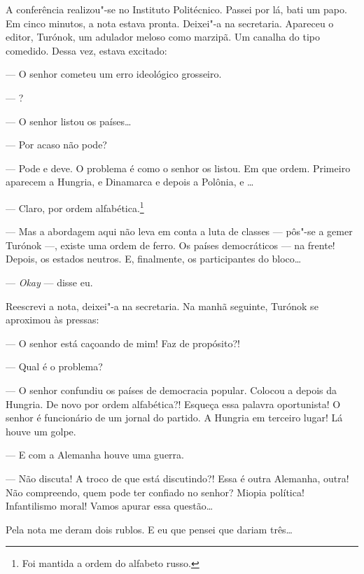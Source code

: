 A conferência realizou"-se no Instituto Politécnico. Passei por lá, bati
um papo. Em cinco minutos, a nota estava pronta. Deixei"-a na secretaria.
Apareceu o editor, Turónok, um adulador meloso como marzipã. Um canalha
do tipo comedido. Dessa vez, estava excitado:

--- O senhor cometeu um erro ideológico grosseiro.

--- ?

--- O senhor listou os países\ldots{}

--- Por acaso não pode?

--- Pode e deve. O problema é como o senhor os listou. Em que ordem.
Primeiro aparecem a Hungria,  e Dinamarca e depois a Polônia,  e
\ldots{}

--- Claro, por ordem alfabética.\footnote{Foi mantida a ordem do
  alfabeto russo.}

--- Mas a abordagem aqui não leva em conta a luta de classes --- pôs"-se a gemer Turónok
---, existe uma ordem de ferro. Os países democráticos --- na frente!
Depois, os estados neutros. E, finalmente, os participantes do bloco\ldots{}

--- \emph{Okay} --- disse eu.

Reescrevi a nota, deixei"-a na secretaria. Na manhã seguinte, Turónok se
aproximou às pressas:

--- O senhor está caçoando de mim! Faz de propósito?!

--- Qual é o problema?

--- O senhor confundiu os países de democracia popular. Colocou a 
depois da Hungria. De novo por ordem alfabética?! Esqueça essa palavra
oportunista! O senhor é funcionário de um jornal do partido. A Hungria
em terceiro lugar! Lá houve um golpe.

--- E com a Alemanha houve uma guerra.

--- Não discuta! A troco de que está discutindo?! Essa é outra Alemanha,
outra! Não compreendo, quem pode ter confiado no senhor? Miopia
política! Infantilismo moral! Vamos apurar essa questão\ldots{}

Pela nota me deram dois rublos. E eu que pensei que dariam três\ldots{}

\movetooddpage
\begin{center}
{}
\end{center}


